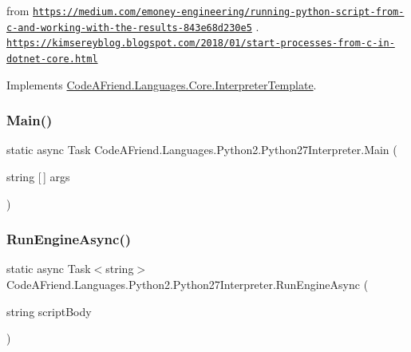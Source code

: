 from \href{https://medium.com/emoney-engineering/running-python-script-from-c-and-working-with-the-results-843e68d230e5}{\tt https\+://medium.\+com/emoney-\/engineering/running-\/python-\/script-\/from-\/c-\/and-\/working-\/with-\/the-\/results-\/843e68d230e5} . \href{https://kimsereyblog.blogspot.com/2018/01/start-processes-from-c-in-dotnet-core.html}{\tt https\+://kimsereyblog.\+blogspot.\+com/2018/01/start-\/processes-\/from-\/c-\/in-\/dotnet-\/core.\+html} 

Implements \mbox{\hyperlink{class_code_a_friend_1_1_languages_1_1_core_1_1_interpreter_template_a2f8560fba2e22a9cdf22c8d2f7bb849f}{Code\+A\+Friend.\+Languages.\+Core.\+Interpreter\+Template}}.

\mbox{\label{class_code_a_friend_1_1_languages_1_1_python2_1_1_python27_interpreter_a81b2649dd7c6a7dc934efbd27e14377b}} 
\subsubsection{\texorpdfstring{Main()}{Main()}}
{\footnotesize\ttfamily static async Task Code\+A\+Friend.\+Languages.\+Python2.\+Python27\+Interpreter.\+Main (\begin{DoxyParamCaption}\item[{string \mbox{[}$\,$\mbox{]}}]{args }\end{DoxyParamCaption})\hspace{0.3cm}{\ttfamily [static]}}

\mbox{\label{class_code_a_friend_1_1_languages_1_1_python2_1_1_python27_interpreter_ad72980fe0c53ba1da906f2e5c5b04c19}} 
\subsubsection{\texorpdfstring{Run\+Engine\+Async()}{RunEngineAsync()}}
{\footnotesize\ttfamily static async Task$<$string$>$ Code\+A\+Friend.\+Languages.\+Python2.\+Python27\+Interpreter.\+Run\+Engine\+Async (\begin{DoxyParamCaption}\item[{string}]{script\+Body }\end{DoxyParamCaption})\hspace{0.3cm}{\ttfamily [static]}}

